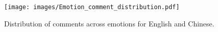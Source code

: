 \documentclass[12pt,a4paper]{report}
\theoremstyle{definition}
\begin{document}
\begin{CJK}{UTF8}{bsmi}
        
        \begin{center}
        \begin{figure}[H]
            \texttt{[image: images/Emotion\_comment\_distribution.pdf]}
            \caption{Distribution of comments across emotions for English and Chinese.}
            \label{fig:distribution}
            

\end{figure}
\end{center}
\end{CJK}
\end{document}
